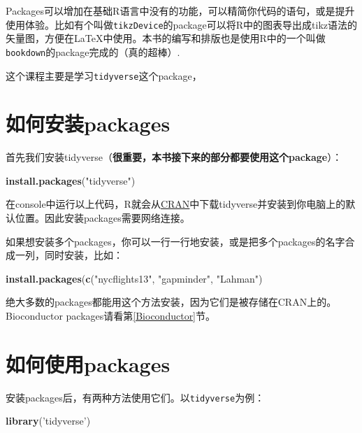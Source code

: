 \documentclass[]{book}
\newenvironment{Shaded}{\begin{snugshade}}{\end{snugshade}}
\newcommand{\KeywordTok}[1]{\textcolor[rgb]{0.13,0.29,0.53}{\textbf{#1}}}
\newcommand{\NormalTok}[1]{#1}
\newcommand{\StringTok}[1]{\textcolor[rgb]{0.31,0.60,0.02}{#1}}
\begin{document}
Packages可以增加在基础R语言中没有的功能，可以精简你代码的语句，或是提升使用体验。比如有个叫做\texttt{tikzDevice}的package可以将R中的图表导出成tikz语法的矢量图，方便在LaTeX中使用。本书的编写和排版也是使用R中的一个叫做\texttt{bookdown}的package完成的（真的超棒）.

这个课程主要是学习\texttt{tidyverse}这个package，

\hypertarget{packages}{%
\section{如何安装packages}\label{packages}}

首先我们安装tidyverse（\textbf{很重要，本书接下来的部分都要使用这个package}）：

\begin{Shaded}
\begin{Highlighting}[]
\KeywordTok{install.packages}\NormalTok{(}\StringTok{"tidyverse"}\NormalTok{)}
\end{Highlighting}
\end{Shaded}

在console中运行以上代码，R就会从\href{https://cran.r-project.org}{CRAN}中下载tidyverse并安装到你电脑上的默认位置。因此安装packages需要网络连接。

如果想安装多个packages，你可以一行一行地安装，或是把多个packages的名字合成一列，同时安装，比如：

\begin{Shaded}
\begin{Highlighting}[]
\KeywordTok{install.packages}\NormalTok{(}\KeywordTok{c}\NormalTok{(}\StringTok{"nycflights13"}\NormalTok{, }\StringTok{"gapminder"}\NormalTok{, }\StringTok{"Lahman"}\NormalTok{)}
\end{Highlighting}
\end{Shaded}

绝大多数的packages都能用这个方法安装，因为它们是被存储在CRAN上的。Bioconductor packages请看第\ref{Bioconductor}节。

\hypertarget{packages}{%
\section{如何使用packages}\label{packages}}

安装packages后，有两种方法使用它们。以\texttt{tidyverse}为例：

\begin{Shaded}
\begin{Highlighting}[]
\KeywordTok{library}\NormalTok{(}\StringTok{'tidyverse'}\NormalTok{)}
\end{Highlighting}
\end{Shaded}
\end{document}
